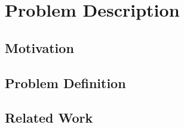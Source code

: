 \section{Problem Description}

	\subsection{Motivation}
	\lipsum[1]

	\subsection{Problem Definition}
	\lipsum[1]

	\subsection{Related Work}
	\lipsum[1]